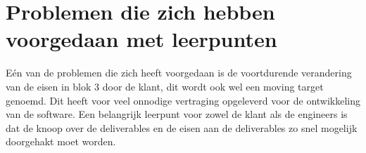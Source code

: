 \section{Problemen die zich hebben voorgedaan met leerpunten}
Eén van de problemen die zich heeft voorgedaan is de voortdurende verandering van de eisen in blok 3 door de klant, dit wordt ook wel een moving target genoemd. Dit heeft voor veel onnodige vertraging opgeleverd voor de ontwikkeling van de software. Een belangrijk leerpunt voor zowel de klant als de engineers is dat de knoop over de deliverables en de eisen aan de deliverables zo snel mogelijk doorgehakt moet worden.